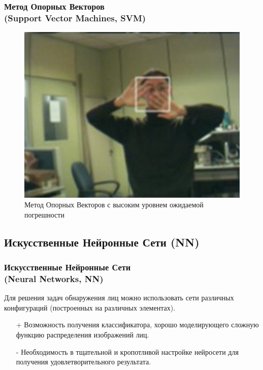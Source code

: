 \documentclass{beamer}
\begin{document}
\begin{frame}
\frametitle{Метод Опорных Векторов\\(Support Vector Machines, SVM)}

\begin{figure}
\includegraphics[scale=0.65]{res/img06}
\caption{Метод Опорных Векторов с высоким уровнем ожидаемой погрешности}
\end{figure}

\end{frame}

\subsection{Искусственные Нейронные Сети (NN)}

\begin{frame}
\frametitle{Искусственные Нейронные Сети\\(Neural Networks, NN)}

Для решения задач обнаружения лиц можно использовать сети различных конфигураций (построенных на различных элементах).
\bigskip

\begin{itemize}
\item[+] Возможность получения классификатора, хорошо моделирующего сложную функцию распределения изображений лиц.
\item[-] Необходимость в тщательной и кропотливой настройке нейросети для получения удовлетворительного результата.
\end{itemize}

\end{frame}
\end{document}
